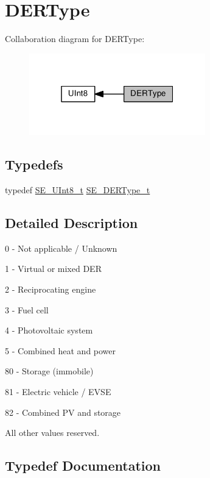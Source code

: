 \hypertarget{group__DERType}{}\section{D\+E\+R\+Type}
\label{group__DERType}
Collaboration diagram for D\+E\+R\+Type\+:\nopagebreak
\begin{figure}[H]
\begin{center}
\leavevmode
\includegraphics[width=217pt]{group__DERType}
\end{center}
\end{figure}
\subsection*{Typedefs}
\begin{DoxyCompactItemize}
\item 
typedef \hyperlink{group__UInt8_gaf7c365a1acfe204e3a67c16ed44572f5}{S\+E\+\_\+\+U\+Int8\+\_\+t} \hyperlink{group__DERType_gad0e420a05951a4331fb39782b428852f}{S\+E\+\_\+\+D\+E\+R\+Type\+\_\+t}
\end{DoxyCompactItemize}


\subsection{Detailed Description}
0 -\/ Not applicable / Unknown

1 -\/ Virtual or mixed D\+ER

2 -\/ Reciprocating engine

3 -\/ Fuel cell

4 -\/ Photovoltaic system

5 -\/ Combined heat and power

80 -\/ Storage (immobile)

81 -\/ Electric vehicle / E\+V\+SE

82 -\/ Combined PV and storage

All other values reserved. 

\subsection{Typedef Documentation}
\mbox{\label{group__DERType_gad0e420a05951a4331fb39782b428852f}} 

